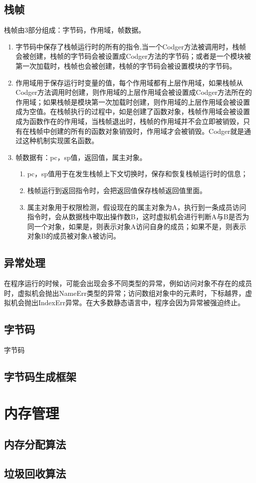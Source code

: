 \documentclass[a4paper,10pt]{article}
\begin{document}
\begin{CJK}{UTF8}{gbsn}
\subsection{栈帧}
栈帧由3部分组成：字节码，作用域，帧数据。
\begin{enumerate}
\item 字节码中保存了栈帧运行时的所有的指令,当一个Codger方法被调用时，栈帧会被创建，栈帧的字节码会被设置成Codger方法的字节码；或者是一个模块被第一次加载时，栈帧也会被创建，栈帧的字节码会被设置模块的字节码。
\item 作用域用于保存运行时变量的值，每个作用域都有上层作用域，如果栈帧从Codger方法调用时创建，则作用域的上层作用域会被设置成Codger方法所在的作用域；如果栈帧是模块第一次加载时创建，则作用域的上层作用域会被设置成为空值。在栈帧执行的过程中，如是创建了函数对象，栈帧作用域会被设置成为函数作在的作用域，当栈帧退出时，栈帧的作用域并不会立即被销毁，只有在栈帧中创建的所有的函数对象销毁时，作用域才会被销毁。Codger就是通过这种机制实现匿名函数。
\item 帧数据有：pc，sp值，返回值，属主对象。
\begin{enumerate}
\item pc，sp值用于在发生栈帧上下文切换时，保存和恢复栈帧运行时的信息；
\item 栈帧运行到返回指令时，会把返回值保存栈帧返回值里面。
\item 属主对象用于权限检测，假设现在的属主对象为A，执行到一条成员访问指令时，会从数据栈中取出操作数B，这时虚拟机会进行判断A与B是否为同一个对象，如果是，则表示对象A访问自身的成员；如果不是，则表示对象B的成员被对象A被访问。
\end{enumerate}
\end{enumerate}
\subsection{异常处理}
在程序运行的时候，可能会出现会多不同类型的异常，例如访问对象不存在的成员时，虚拟机会抛出NameErr类型的异常；访问数组对象中的元素时，下标越界，虚拟机会抛出IndexErr异常。在大多数静态语言中，程序会因为异常被强迫终止。
\subsection{字节码}
字节码


\subsection{字节码生成框架}
\section{内存管理}
\subsection{内存分配算法}
\subsection{垃圾回收算法}

\end{CJK}
\end{document}
